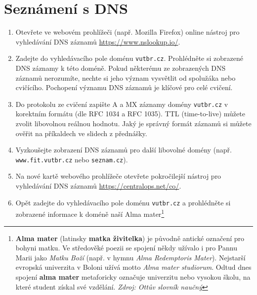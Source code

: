 \section{Seznámení s DNS}
\begin{enumerate}
    \item Otevřete ve webovém prohlížeči (např. Mozilla Firefox) online nástroj pro vyhledávání DNS záznamů \url{https://www.nslookup.io/}.
    \item Zadejte do vyhledávacího pole doménu \texttt{vutbr.cz}. Prohlédněte si zobrazené DNS záznamy k této doméně. Pokud některému ze zobrazených DNS záznamů nerozumíte, nechte si jeho význam vysvětlit od spolužáka nebo cvičícího. Pochopení významu DNS záznamů je klíčové pro celé cvičení.
    \item Do protokolu ze cvičení zapište A a MX záznamy domény \texttt{vutbr.cz} v korektním formátu (dle RFC 1034 a RFC 1035). TTL (time-to-live) můžete zvolit libovolnou reálnou hodnotu. Jaký je správný formát záznamů si můžete ověřit na příkaldech ve slidech z přednášky.
    \item Vyzkoušejte zobrazení DNS záznamů pro další libovolné domény (např. \texttt{www.fit.vutbr.cz} nebo \texttt{seznam.cz}).
    \item Na nové kartě webového prohlížeče otevřete pokročilejší nástroj pro vyhledávání DNS záznamů \url{https://centralops.net/co/}.
    \item Opět zadejte do vyhledávacího pole doménu \texttt{vutbr.cz} a prohlédněte si zobrazené informace k doméně naší Alma mater\footnote{\textbf{Alma mater} (latinsky \textbf{matka živitelka}) je původně antické označení pro bohyni matku. Ve středověké poezii se spojení někdy užívalo i pro Pannu Marii jako \emph{Matku Boží} (např. v hymnu \emph{Alma Redemptoris Mater}). Nejstarší evropská univerzita v Boloni užívá motto \emph{Alma mater studiorum}. Odtud dnes spojení \textbf{alma mater} metaforicky označuje univerzitu nebo vysokou školu, na které student získal své vzdělání. \emph{Zdroj: Ottův slovník naučný}} 
\end{enumerate}

